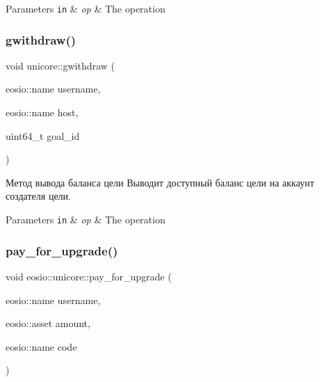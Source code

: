 \begin{DoxyParams}[1]{Parameters}
\mbox{\tt in}  & {\em op} & The operation \\
\hline
\end{DoxyParams}
\mbox{\label{classeosio_1_1unicore_a4faa41a68505840e66f78e350412723c}} 
\subsubsection{\texorpdfstring{gwithdraw()}{gwithdraw()}}
{\footnotesize\ttfamily void unicore\+::gwithdraw (\begin{DoxyParamCaption}\item[{eosio\+::name}]{username,  }\item[{eosio\+::name}]{host,  }\item[{uint64\+\_\+t}]{goal\+\_\+id }\end{DoxyParamCaption})}



Метод вывода баланса цели Выводит доступный баланс цели на аккаунт создателя цели. 


\begin{DoxyParams}[1]{Parameters}
\mbox{\tt in}  & {\em op} & The operation \\
\hline
\end{DoxyParams}
\mbox{\label{classeosio_1_1unicore_af4376715edeb68b09c6921cd4d101345}} 
\subsubsection{\texorpdfstring{pay\+\_\+for\+\_\+upgrade()}{pay\_for\_upgrade()}}
{\footnotesize\ttfamily void eosio\+::unicore\+::pay\+\_\+for\+\_\+upgrade (\begin{DoxyParamCaption}\item[{eosio\+::name}]{username,  }\item[{eosio\+::asset}]{amount,  }\item[{eosio\+::name}]{code }\end{DoxyParamCaption})\hspace{0.3cm}{\ttfamily [static]}}



